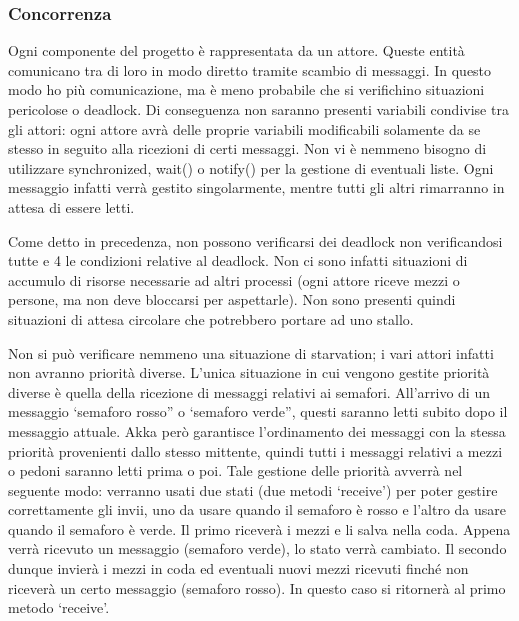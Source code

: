 \documentclass{article}
\begin{document}
\subsubsection{Concorrenza}
\lettrine[lines=1]{O}{}gni componente del progetto \`{e} rappresentata da un attore. Queste entit\`{a} comunicano tra di loro in modo diretto tramite scambio di messaggi. In questo modo ho pi\`{u} comunicazione, ma \`{e} meno probabile che si verifichino situazioni pericolose o deadlock. Di conseguenza non saranno presenti variabili condivise tra gli attori: ogni attore avr\`{a} delle proprie variabili modificabili solamente da se stesso in seguito alla ricezioni di certi messaggi. Non vi \`{e} nemmeno bisogno di utilizzare synchronized, wait() o notify() per la gestione di eventuali liste. Ogni messaggio infatti verr\`{a} gestito singolarmente, mentre tutti gli altri rimarranno in attesa di essere letti.
\par Come detto in precedenza, non possono verificarsi dei deadlock non verificandosi tutte e 4 le condizioni relative al deadlock. Non ci sono infatti situazioni di accumulo di risorse necessarie ad altri processi (ogni attore riceve mezzi o persone, ma non deve bloccarsi per aspettarle). Non sono presenti quindi situazioni di attesa circolare che potrebbero portare ad uno stallo.
\par Non si pu\`{o} verificare nemmeno una situazione di starvation; i vari attori infatti non avranno priorit\`{a} diverse. L\textquoteright{}unica situazione in cui vengono gestite priorit\`{a} diverse \`{e} quella della ricezione di messaggi relativi ai semafori. All\textquoteright{}arrivo di un messaggio \lq semaforo rosso” o \lq semaforo verde”, questi saranno letti subito dopo il messaggio attuale. Akka per\`{o} garantisce l\textquoteright{}ordinamento dei messaggi con la stessa priorit\`{a} provenienti dallo stesso mittente, quindi tutti i messaggi relativi a mezzi o pedoni saranno letti prima o poi.
Tale gestione delle priorit\`{a} avverr\`{a} nel seguente modo: verranno usati  due stati (due metodi \lq receive\rq) per poter gestire correttamente gli invii, uno da usare quando il semaforo \`{e} rosso e l\textquoteright{}altro da usare quando il semaforo \`{e} verde. Il primo ricever\`{a} i mezzi e li salva nella coda. Appena verr\`{a} ricevuto un messaggio (semaforo verde), lo stato verr\`{a} cambiato. Il secondo dunque invier\`{a} i mezzi in coda ed eventuali nuovi mezzi ricevuti finch\'{e} non ricever\`{a} un certo messaggio (semaforo rosso). In questo caso si ritorner\`{a} al primo metodo \lq receive\rq.
\end{document}
